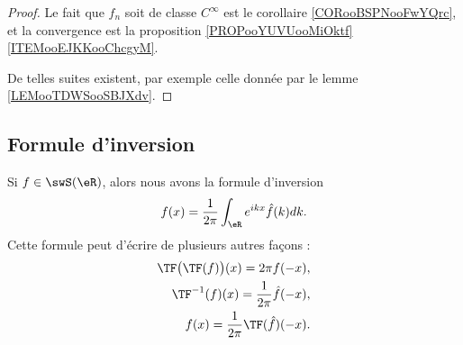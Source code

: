 \begin{proof}
    Le fait que \( f_n\) soit de classe \(  C^{\infty}\) est le corollaire \ref{CORooBSPNooFwYQrc}, et la convergence est la proposition \ref{PROPooYUVUooMiOktf}\ref{ITEMooEJKKooChcgyM}.

    De telles suites existent, par exemple celle donnée par le lemme \ref{LEMooTDWSooSBJXdv}.
\end{proof}

\subsection{Formule d'inversion}

\begin{proposition}       \label{PROPooLWTJooReGlaN}
    Si \( f\in\swS(\eR)\), alors nous avons  la formule d'inversion
    \begin{equation}        \label{EQooHIDAooHARdNZ}
        f(x)=\frac{1}{ 2\pi }\int_{\eR} e^{ikx}\hat f(k)dk.
    \end{equation}
    Cette formule peut d'écrire de plusieurs autres façons :
    \begin{subequations}
        \begin{align}
        \TF\big( \TF(f) \big)(x)=2\pi f(-x),\\
        \TF^{-1}(f)(x)=\frac{1}{ 2\pi }\hat f(-x),\\
        f(x)=\frac{1}{ 2\pi }\TF(\hat f)(-x).     \label{EQooWBZTooPeBNeh}
        \end{align}
    \end{subequations}
\end{proposition}

